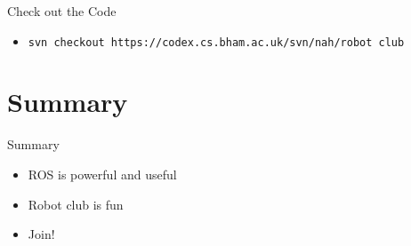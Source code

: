\documentclass{beamer}
\begin{document}
\begin{frame}{Check out the Code}

  \begin{itemize}
  \item \texttt{svn checkout https://codex.cs.bham.ac.uk/svn/nah/robot club}
  \end{itemize}

\end{frame}

\section*{Summary}

\begin{frame}{Summary}

  \begin{itemize}
  \item ROS is powerful and useful
  \item Robot club is fun
  \item Join!
  \end{itemize}

\end{frame}
\end{document}
